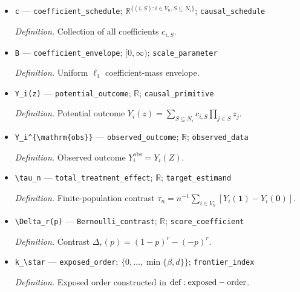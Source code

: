 \documentclass{article}
\begin{document}
\begin{itemize}
  \par\smallskip\noindent\emph{Definition.} Coefficient of \(\prod_{j\in S}z_j\) in unit \(i\)'s potential outcome.
  \item \texttt{c} --- \texttt{coefficient\_\allowbreak{}schedule}; \(\mathbb R^{\{(i,S):i\in V_n,S\subseteq N_i\}}\); \texttt{causal\_\allowbreak{}schedule}
  \par\smallskip\noindent\emph{Definition.} Collection of all coefficients \(c_{i,S}\).
  \item \texttt{B} --- \texttt{coefficient\_\allowbreak{}envelope}; \([0,\infty)\); \texttt{scale\_\allowbreak{}parameter}
  \par\smallskip\noindent\emph{Definition.} Uniform \(\ell_1\) coefficient-mass envelope.
  \item \texttt{Y\_\allowbreak{}i(z)} --- \texttt{potential\_\allowbreak{}outcome}; \(\mathbb R\); \texttt{causal\_\allowbreak{}primitive}
  \par\smallskip\noindent\emph{Definition.} Potential outcome \(Y_i(z)=\sum_{S\subseteq N_i}c_{i,S}\prod_{j\in S}z_j\).
  \item \texttt{Y\_\allowbreak{}i\textasciicircum{}\{\textbackslash{}\allowbreak{}mathrm\{obs\}\allowbreak{}\}\allowbreak{}} --- \texttt{observed\_\allowbreak{}outcome}; \(\mathbb R\); \texttt{observed\_\allowbreak{}data}
  \par\smallskip\noindent\emph{Definition.} Observed outcome \(Y_i^{\mathrm{obs}}=Y_i(Z)\).
  \item \texttt{\textbackslash{}\allowbreak{}tau\_\allowbreak{}n} --- \texttt{total\_\allowbreak{}treatment\_\allowbreak{}effect}; \(\mathbb R\); \texttt{target\_\allowbreak{}estimand}
  \par\smallskip\noindent\emph{Definition.} Finite-population contrast \(\tau_n=n^{-1}\sum_{i\in V_n}[Y_i(\mathbf 1)-Y_i(\mathbf 0)]\).
  \item \texttt{\textbackslash{}\allowbreak{}Delta\_\allowbreak{}r(p)} --- \texttt{Bernoulli\_\allowbreak{}contrast}; \(\mathbb R\); \texttt{score\_\allowbreak{}coefficient}
  \par\smallskip\noindent\emph{Definition.} Contrast \(\Delta_r(p)=(1-p)^r-(-p)^r\).
  \item \texttt{k\_\allowbreak{}\textbackslash{}\allowbreak{}star} --- \texttt{exposed\_\allowbreak{}order}; \(\{0,\ldots,\min\{\beta,d\}\}\); \texttt{frontier\_\allowbreak{}index}
  \par\smallskip\noindent\emph{Definition.} Exposed order constructed in \({\rm def:exposed-order}\).

\end{itemize}
\end{document}
